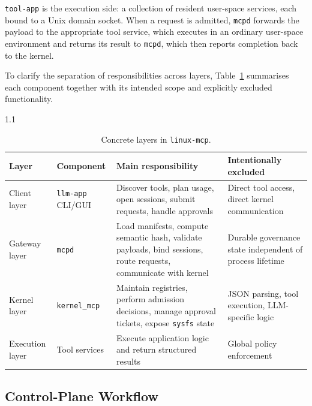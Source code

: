 \texttt{tool-app} is the execution side: a collection of resident user-space services, each bound to a Unix domain socket.
When a request is admitted, \texttt{mcpd} forwards the payload to the appropriate tool service, which executes in an ordinary user-space environment and returns its result to \texttt{mcpd}, which then reports completion back to the kernel.

To clarify the separation of responsibilities across layers, Table~\ref{tab:architecture_layers} summarises each component together with its intended scope and explicitly excluded functionality.

\begin{table}[htbp]
\centering
\small
\begin{spacing}{1.1}
\begin{tabular}{l p{3cm} p{4.8cm} p{4.5cm}}
\toprule
\textbf{Layer} & \textbf{Component} & \textbf{Main responsibility} & \textbf{Intentionally excluded} \\
\midrule

Client layer
& \texttt{llm-app} CLI/GUI
& Discover tools, plan usage, open sessions, submit requests, handle approvals
& Direct tool access, direct kernel communication \\

Gateway layer
& \texttt{mcpd}
& Load manifests, compute semantic hash, validate payloads, bind sessions, route requests, communicate with kernel
& Durable governance state independent of process lifetime \\

Kernel layer
& \texttt{kernel\_mcp}
& Maintain registries, perform admission decisions, manage approval tickets, expose \texttt{sysfs} state
& JSON parsing, tool execution, LLM-specific logic \\

Execution layer
& Tool services
& Execute application logic and return structured results
& Global policy enforcement \\

\bottomrule
\end{tabular}
\end{spacing}
\caption{Concrete layers in \texttt{linux-mcp}.}
\label{tab:architecture_layers}
\end{table}



\subsection{Control-Plane Workflow}

